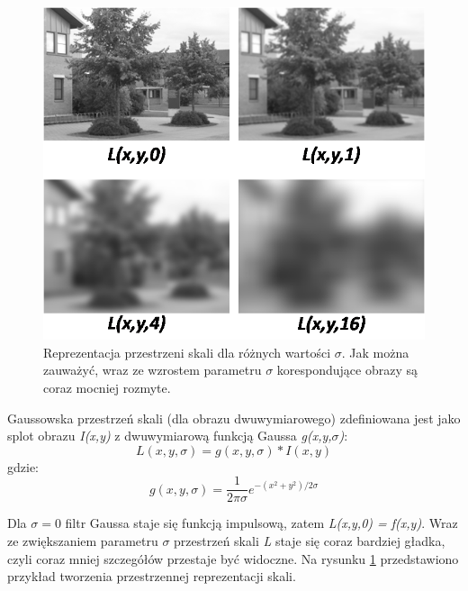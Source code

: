 \begin{figure}[h]
	\includegraphics[width=15cm]{ScaleSpaceRepresentation}
	\centering
	\caption{Reprezentacja przestrzeni skali dla różnych wartości $\sigma$. Jak można zauważyć, wraz ze wzrostem parametru $\sigma$ korespondujące obrazy są coraz mocniej rozmyte.}
	\label{im: Scale Space Representation}
\end{figure} 


Gaussowska przestrzeń skali (dla obrazu dwuwymiarowego) zdefiniowana jest jako splot obrazu \textit{I(x,y)} z dwuwymiarową funkcją Gaussa \textit{g(x,y,$\sigma$)}:
\begin{equation}
L(x,y,\sigma) = g(x,y,\sigma)*I(x,y)
\end{equation}
gdzie:
\begin{equation}
g(x,y,\sigma) = \frac{1}{2\pi\sigma}e^{-(x^2+y^2)/2\sigma}
\end{equation}

Dla $\sigma = 0$ filtr Gaussa staje się funkcją impulsową, zatem \textit{L(x,y,0) = f(x,y)}. Wraz ze zwiększaniem parametru $\sigma$ przestrzeń skali \textit{L} staje się coraz bardziej gładka, czyli coraz mniej szczegółów przestaje być widoczne. Na rysunku \ref{im: Scale Space Representation} przedstawiono przykład tworzenia przestrzennej reprezentacji skali.

